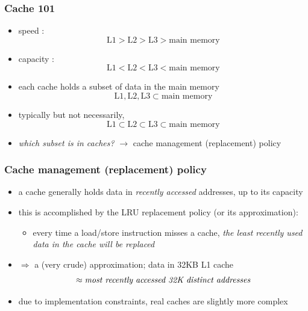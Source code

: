 \documentclass[12pt,dvipdfmx]{beamer}
\newcommand{\ao}[1]{{\color{blue}#1}}
\begin{document}

\begin{frame}
\frametitle{Cache 101}
\begin{itemize}
\item<1-> speed : 
\[ \mbox{L1} > \mbox{L2} > \mbox{L3} > \mbox{main memory} \]
\item<2-> capacity :
\[ \mbox{L1} < \mbox{L2} < \mbox{L3} < \mbox{main memory} \]
\item<3-> each cache holds a subset of data in the main memory
\[ \mbox{L1}, \mbox{L2}, \mbox{L3} \subset \mbox{main memory} \]
\item<4-> typically but not necessarily, 
  \[ \mbox{} \mbox{L1} \subset \mbox{L2} \subset \mbox{L3} \subset \mbox{main memory} \]
\item<5-> \ao{\em which subset is in caches?} 
  $\rightarrow$ cache management (replacement) policy
\end{itemize}
\end{frame}

\begin{frame}
\frametitle{Cache management (replacement) policy}
\begin{itemize}

\item<1-> a cache generally holds data in \ao{\em recently accessed} 
  addresses, up to its capacity

\item<2-> this is accomplished by the \ao{LRU replacement} policy
  (or its approximation):
  \begin{itemize}
  \item every time a load/store instruction misses
    a cache, \ao{\it the least recently used data in the
      cache will be replaced}
  \end{itemize}

\item<3-> $\Rightarrow$ a (very crude) approximation; 
  data in 32KB L1 cache
\[ \approx \mbox{\ao{\em most recently accessed 32K distinct addresses}} \]

\item<4-> due to implementation constraints, real caches are slightly
  more complex
\end{itemize}
\end{frame}
\end{document}
